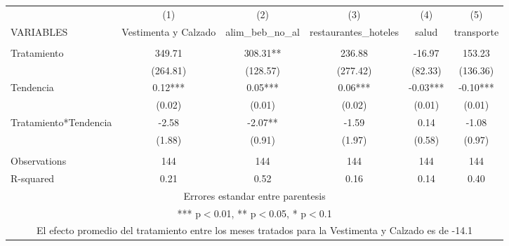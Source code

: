 \documentclass[]{article}
\begin{document}
\begin{tabular}{lccccc} \hline
 & (1) & (2) & (3) & (4) & (5) \\
VARIABLES & Vestimenta y Calzado & alim\_beb\_no\_al & restaurantes\_hoteles & salud & transporte \\ \hline
 &  &  &  &  &  \\
Tratamiento & 349.71 & 308.31** & 236.88 & -16.97 & 153.23 \\
 & (264.81) & (128.57) & (277.42) & (82.33) & (136.36) \\
Tendencia & 0.12*** & 0.05*** & 0.06*** & -0.03*** & -0.10*** \\
 & (0.02) & (0.01) & (0.02) & (0.01) & (0.01) \\
Tratamiento*Tendencia & -2.58 & -2.07** & -1.59 & 0.14 & -1.08 \\
 & (1.88) & (0.91) & (1.97) & (0.58) & (0.97) \\
 &  &  &  &  &  \\
Observations & 144 & 144 & 144 & 144 & 144 \\
 R-squared & 0.21 & 0.52 & 0.16 & 0.14 & 0.40 \\ \hline
\multicolumn{6}{c}{ Errores estandar entre parentesis} \\
\multicolumn{6}{c}{ *** p$<$0.01, ** p$<$0.05, * p$<$0.1} \\
\multicolumn{6}{c}{ El efecto promedio del tratamiento entre los meses tratados para la Vestimenta y Calzado es de -14.1} \\
\end{tabular}
\end{document}
